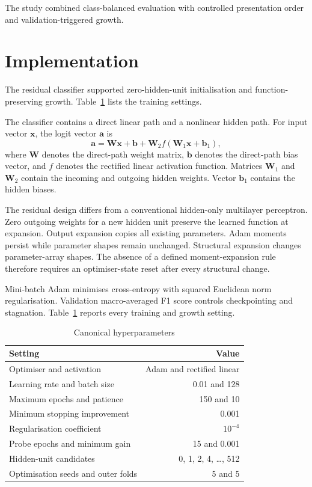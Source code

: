 \documentclass[conference,10pt]{IEEEtran}
\begin{document}
The study combined class-balanced evaluation with controlled presentation order and validation-triggered growth.

\section{Implementation}
The residual classifier supported zero-hidden-unit initialisation and function-preserving growth. Table~\ref{tab:hyperparameters} lists the training settings.

The classifier contains a direct linear path and a nonlinear hidden path. For input vector $\boldsymbol{x}$, the logit vector $\boldsymbol{a}$ is
\begin{equation}
 \boldsymbol{a}=\boldsymbol{W}\boldsymbol{x}+\boldsymbol{b}+
 \boldsymbol{W}_{2}f(\boldsymbol{W}_{1}\boldsymbol{x}+\boldsymbol{b}_{1}),
\end{equation}
where $\boldsymbol{W}$ denotes the direct-path weight matrix, $\boldsymbol{b}$ denotes the direct-path bias vector, and $f$ denotes the rectified linear activation function. Matrices $\boldsymbol{W}_{1}$ and $\boldsymbol{W}_{2}$ contain the incoming and outgoing hidden weights. Vector $\boldsymbol{b}_{1}$ contains the hidden biases.

The residual design differs from a conventional hidden-only multilayer perceptron. Zero outgoing weights for a new hidden unit preserve the learned function at expansion. Output expansion copies all existing parameters. Adam moments persist while parameter shapes remain unchanged. Structural expansion changes parameter-array shapes. The absence of a defined moment-expansion rule therefore requires an optimiser-state reset after every structural change.

Mini-batch Adam minimises cross-entropy with squared Euclidean norm regularisation. Validation macro-averaged F1 score controls checkpointing and stagnation. Table~\ref{tab:hyperparameters} reports every training and growth setting.

\begin{table}[t]
\caption{Canonical hyperparameters}
\label{tab:hyperparameters}\centering
\begin{tabular}{lr}\toprule
Setting & Value\\\midrule
Optimiser and activation & Adam and rectified linear\\
Learning rate and batch size & 0.01 and 128\\
Maximum epochs and patience & 150 and 10\\
Minimum stopping improvement & 0.001\\
Regularisation coefficient & $10^{-4}$\\
Probe epochs and minimum gain & 15 and 0.001\\
Hidden-unit candidates & 0, 1, 2, 4, \ldots, 512\\
Optimisation seeds and outer folds & 5 and 5\\\bottomrule
\end{tabular}
\end{table}
\end{document}
